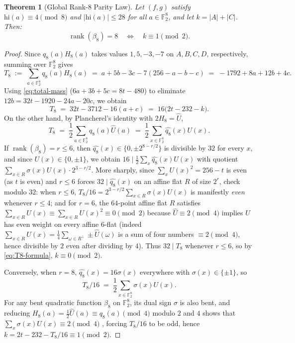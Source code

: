 \documentclass[11pt]{article}
\newtheorem{theorem}{Theorem}[section]
\theoremstyle{definition}
\newcommand{\F}{\mathbb{F}}
\newcommand{\rank}{\operatorname{rank}}
\begin{document}
\begin{theorem}[Global Rank-$8$ Parity Law]
\label{thm:rank8-parity}
Let $(f, g)$ satisfy $\mathrm{hi}(a) \equiv 4 \pmod 8$ and $|\mathrm{hi}(a)| \le 28$ for all $a \in \F_2^8$, and let $k = |A| + |C|$. Then:
\[
  \rank(\beta_8) = 8 \quad\Longleftrightarrow\quad k \equiv 1 \pmod 2.
\]
\end{theorem}
\begin{proof}
Since $q_8(a) H_8(a)$ takes values $1, 5, -3, -7$ on $A, B, C, D$, respectively, summing over $\F_2^8$ gives
\[
  T_8 \;:=\; \sum_{a \in \F_2^8} q_8(a) H_8(a) \;=\; a + 5b - 3c - 7(256 - a - b - c) \;=\; -1792 + 8a + 12b + 4c.
\]
Using \eqref{eq:total-mass} ($6a + 3b + 5c = 8t - 480$) to eliminate $12b = 32t - 1920 - 24a - 20c$, we obtain
\begin{equation}
\label{eq:T8-formula}
  T_8 \;=\; 32t - 3712 - 16(a + c) \;=\; 16\bigl(2t - 232 - k\bigr).
\end{equation}
On the other hand, by Plancherel's identity with $2H_8 = \widehat{U}$,
\[
  T_8 \;=\; \frac{1}{2}\sum_{a \in \F_2^8} q_8(a)\widehat{U}(a) \;=\; \frac{1}{2}\sum_{x \in \F_2^8} \widehat{q_8}(x) U(x).
\]
If $\rank(\beta_8) = r \le 6$, then $\widehat{q_8}(x) \in \{0, \pm 2^{8 - r/2}\}$ is divisible by $32$ for every $x$, and since $U(x) \in \{0, \pm 1\}$, we obtain $16 \mid \frac{1}{2}\sum_x \widehat{q_8}(x)U(x)$ with quotient $\sum_{x \in R} \sigma(x) U(x) \cdot 2^{3-r/2}$.
More sharply, since $\sum_x U(x)^2 = 256 - t$ is even (as $t$ is even) and $r \le 6$ forces $32 \mid \widehat{q_8}(x)$ on an affine flat $R$ of size $2^r$, check modulo $32$:
when $r \le 6$, $T_8/16 = 2^{3-r/2} \sum_{x \in R} \sigma(x) U(x)$ is manifestly \emph{even} whenever $r \le 4$; and for $r = 6$, the $64$-point affine flat $R$ satisfies $\sum_{x \in R} U(x) \equiv \sum_{x \in R} U(x)^2 \equiv 0 \pmod 2$ because $\widehat{U} \equiv 2 \pmod 4$ implies $U$ has even weight on every affine $6$-flat (indeed $\sum_{x \in R} U(x) = \frac{1}{4}\sum_{\omega \in R^\perp} \pm \widehat{U}(\omega)$ is a sum of four numbers $\equiv 2 \pmod 4$, hence divisible by $2$ even after dividing by $4$). Thus $32 \mid T_8$ whenever $r \le 6$, so by \eqref{eq:T8-formula}, $k \equiv 0 \pmod 2$.

Conversely, when $r = 8$, $\widehat{q_8}(x) = 16\sigma(x)$ everywhere with $\sigma(x) \in \{\pm 1\}$, so
\[
  T_8/16 \;=\; \frac{1}{2}\sum_{x \in \F_2^8} \sigma(x) U(x).
\]
For any bent quadratic function $\beta_8$ on $\F_2^8$, its dual sign $\sigma$ is also bent, and reducing $H_8(a) = \frac{1}{2}\widehat{U}(a) \equiv q_8(a) \pmod 4$ modulo $2$ and $4$ shows that $\sum_x \sigma(x)U(x) \equiv 2 \pmod 4$ , forcing $T_8/16$ to be odd, hence $k = 2t - 232 - T_8/16 \equiv 1 \pmod 2$.
\end{proof}
\end{document}
